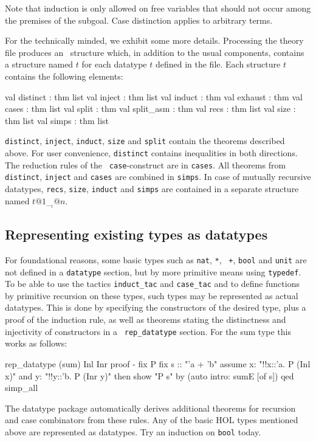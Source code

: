 Note that induction is only allowed on free variables that should not occur
among the premises of the subgoal. Case distinction applies to arbitrary terms.

\bigskip


For the technically minded, we exhibit some more details.  Processing the
theory file produces an \ML\ structure which, in addition to the usual
components, contains a structure named $t$ for each datatype $t$ defined in
the file.  Each structure $t$ contains the following elements:
\begin{ttbox}
val distinct : thm list
val inject : thm list
val induct : thm
val exhaust : thm
val cases : thm list
val split : thm
val split_asm : thm
val recs : thm list
val size : thm list
val simps : thm list
\end{ttbox}
\texttt{distinct}, \texttt{inject}, \texttt{induct}, \texttt{size}
and \texttt{split} contain the theorems
described above.  For user convenience, \texttt{distinct} contains
inequalities in both directions.  The reduction rules of the {\tt
  case}-construct are in \texttt{cases}.  All theorems from {\tt
  distinct}, \texttt{inject} and \texttt{cases} are combined in \texttt{simps}.
In case of mutually recursive datatypes, \texttt{recs}, \texttt{size}, \texttt{induct}
and \texttt{simps} are contained in a separate structure named $t@1_\ldots_t@n$.


\subsection{Representing existing types as datatypes}\label{subsec:datatype:rep_datatype}

For foundational reasons, some basic types such as \texttt{nat}, \texttt{*}, {\tt
  +}, \texttt{bool} and \texttt{unit} are not defined in a \texttt{datatype} section,
but by more primitive means using \texttt{typedef}. To be able to use the
tactics \texttt{induct_tac} and \texttt{case_tac} and to define functions by
primitive recursion on these types, such types may be represented as actual
datatypes.  This is done by specifying the constructors of the desired type,
plus a proof of the  induction rule, as well as theorems
stating the distinctness and injectivity of constructors in a {\tt
rep_datatype} section.  For the sum type this works as follows:
\begin{ttbox}
rep_datatype (sum) Inl Inr
proof -
  fix P
  fix s :: "'a + 'b"
  assume x: "!!x::'a. P (Inl x)" and y: "!!y::'b. P (Inr y)"
  then show "P s" by (auto intro: sumE [of s])
qed simp_all
\end{ttbox}
The datatype package automatically derives additional theorems for recursion
and case combinators from these rules.  Any of the basic HOL types mentioned
above are represented as datatypes.  Try an induction on \texttt{bool}
today.



